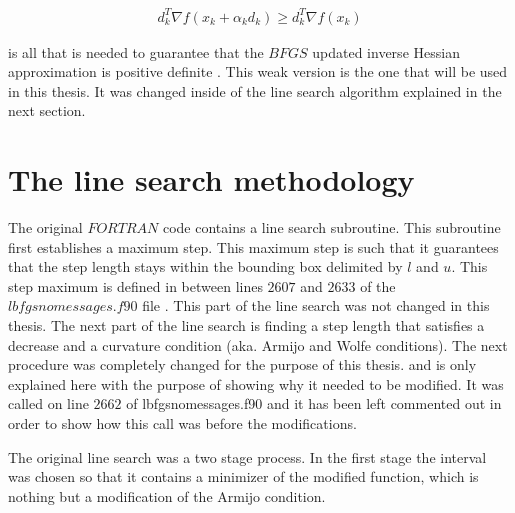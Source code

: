 \begin{equation}
  \begin{aligned}
    d_k^T \nabla f(x_k + \alpha _k d_k) \geq d_k^T \nabla f(x_k)
  \end{aligned}
\end{equation}

is all that is needed to guarantee that the $BFGS$ updated inverse Hessian approximation is positive definite \citep{overtonlewis}. This weak version is the one that will be used in this thesis. It was changed inside of the line search algorithm explained in the next section.

\section{The line search methodology}

The original $FORTRAN$ code \citep{lbfgsbsoftware} contains a line search subroutine. This subroutine first establishes a maximum step. This maximum step is such that it guarantees that the step length stays within the bounding box delimited by $l$ and $u$. This step maximum is defined in between lines $2607$ and $2633$ of the $lbfgsnomessages.f90$ file \citep{lbfgsbNS} . This part of the line search was not changed in this thesis. The next part of the line search is finding a step length that satisfies a decrease and a curvature condition (aka. Armijo and Wolfe conditions). The next procedure was completely changed for the purpose of this thesis. and is only explained here with the purpose of showing why it needed to be modified. It was called on line $2662$ of lbfgsnomessages.f90 and it has been left commented out in order to show how this call was before the modifications.

The original line search was a two stage process. In the first stage the interval was chosen so that it contains a minimizer of the modified function, which is nothing but a modification of the Armijo condition.

